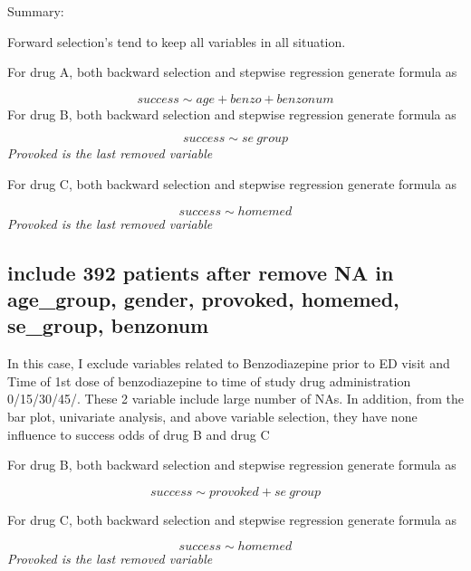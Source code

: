 \documentclass[
]{article}
\begin{document}
Summary:

Forward selection's tend to keep all variables in all situation.

For drug A, both backward selection and stepwise regression generate
formula as

\[success \sim age + benzo + benzonum\] For drug B, both backward
selection and stepwise regression generate formula as

\[success \sim se\ group\] \emph{Provoked is the last removed variable}

For drug C, both backward selection and stepwise regression generate
formula as

\[success \sim homemed\] \emph{Provoked is the last removed variable}

\hypertarget{include-392-patients-after-remove-na-in-age_group-gender-provoked-homemed-se_group-benzonum}{%
\subsection{include 392 patients after remove NA in age\_group, gender,
provoked, homemed, se\_group,
benzonum}\label{include-392-patients-after-remove-na-in-age_group-gender-provoked-homemed-se_group-benzonum}}

In this case, I exclude variables related to Benzodiazepine prior to ED
visit and Time of 1st dose of benzodiazepine to time of study drug
administration 0/15/30/45/. These 2 variable include large number of
NAs. In addition, from the bar plot, univariate analysis, and above
variable selection, they have none influence to success odds of drug B
and drug C

For drug B, both backward selection and stepwise regression generate
formula as

\[success \sim provoked + se\ group\]

For drug C, both backward selection and stepwise regression generate
formula as

\[success \sim homemed\] \emph{Provoked is the last removed variable}
\end{document}
